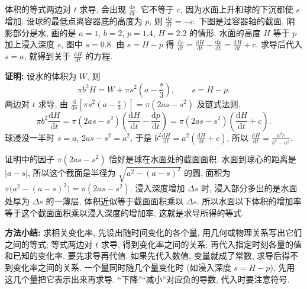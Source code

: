 \documentclass[UTF8,openany]{ctexbook}
\theoremstyle{chinesetextbook}
\newenvironment{cnproof}{\par\indent\textbf{证明:} \ignorespaces}{\par}
\newcommand{\dd}{\mathrm d}
\begin{document}
体积的等式两边对 $t$ 求导, 会出现 $\displaystyle\frac{\dd s}{\dd t}$. 它不等于 $c$, 因为水面上升和球的下沉都使 $s$ 增加. 设球的最低点离容器底的高度为 $p$, 则 $\displaystyle\frac{\dd p}{\dd t}=-c$. 下图是过容器轴的截面, 阴影部分是水, 画的是 $a=1$, $b=2$, $p=1.4$, $H=2.2$ 的情形. 水面的高度 $H$ 等于 $p$ 加上浸入深度 $s$, 图中 $s=0.8$. 由 $s=H-p$ 得 $\displaystyle\frac{\dd s}{\dd t}=\frac{\dd H}{\dd t}-\frac{\dd p}{\dd t}=\frac{\dd H}{\dd t}+c$. 求导后代入 $s=a$, 就得到关于 $\displaystyle\frac{\dd H}{\dd t}$ 的方程.
\begin{center}
\end{center}
\begin{cnproof}
设水的体积为 $W$, 则
\[
\pi b^2H=W+\pi s^2\left(a-\frac s3\right),\qquad s=H-p.
\]
两边对 $t$ 求导, 由 $\displaystyle\frac{\dd}{\dd s}\left[\pi s^2\left(a-\frac s3\right)\right]=\pi(2as-s^2)$ 及链式法则,
\[
\pi b^2\frac{\dd H}{\dd t}=\pi(2as-s^2)\left(\frac{\dd H}{\dd t}-\frac{\dd p}{\dd t}\right)=\pi(2as-s^2)\left(\frac{\dd H}{\dd t}+c\right).
\]
球浸没一半时 $s=a$, $2as-s^2=a^2$, 于是 $\displaystyle b^2\frac{\dd H}{\dd t}=a^2\left(\frac{\dd H}{\dd t}+c\right)$, 所以 $\displaystyle\frac{\dd H}{\dd t}=\frac{a^2c}{b^2-a^2}$.
\end{cnproof}

证明中的因子 $\pi(2as-s^2)$ 恰好是球在水面处的截面面积. 水面到球心的距离是 $|a-s|$, 所以这个截面是半径为 $\sqrt{a^2-(a-s)^2}$ 的圆, 面积为 $\pi\bigl(a^2-(a-s)^2\bigr)=\pi(2as-s^2)$. 浸入深度增加 $\Delta s$ 时, 浸入部分多出的是水面处厚为 $\Delta s$ 的一薄层, 体积近似等于截面面积乘以 $\Delta s$. 所以水面以下体积的增加率等于这个截面面积乘以浸入深度的增加率, 这就是求导所得的等式.
\par\indent\textbf{方法小结:} 求相关变化率, 先设出随时间变化的各个量, 用几何或物理关系写出它们之间的等式; 等式两边对 $t$ 求导, 得到变化率之间的关系; 再代入指定时刻各量的值和已知的变化率. 要先求导再代值. 如果先代入数值, 变量就成了常数, 求导后得不到变化率之间的关系. 一个量同时随几个量变化时 (如浸入深度 $s=H-p$), 先用这几个量把它表示出来再求导. “下降”“减小”对应负的导数, 代入时要注意符号.
\end{document}
